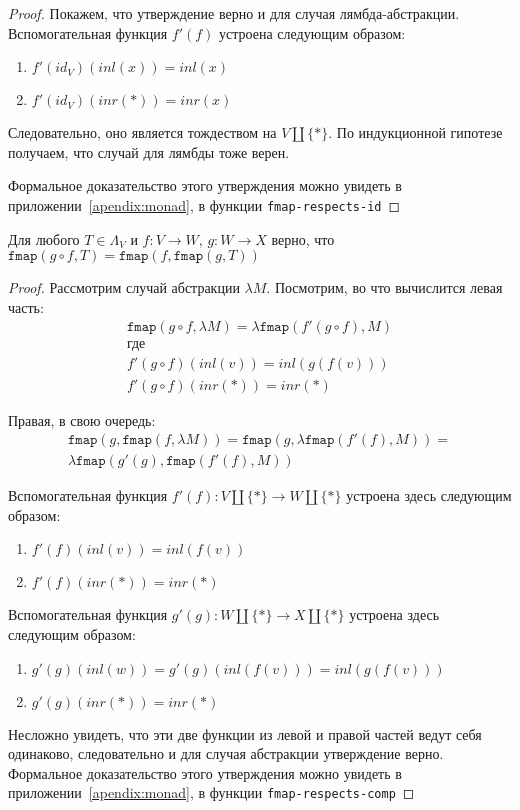 \begin{proof}
  Покажем, что утверждение верно и для случая лямбда-абстракции. Вспомогательная функция $f'(f)$ устроена следующим образом:
  \begin{enumerate}
    \item $f'(id_{V})(inl(x)) = inl(x)$
    \item $f'(id_{V})(inr(*)) = inr(x)$
  \end{enumerate}
  Следовательно, оно является тождеством на $V \coprod \{*\}$. По индукционной гипотезе получаем, что случай для лямбды тоже верен.

  Формальное доказательство этого утверждения можно увидеть в приложении~\ref{apendix:monad}, в функции \texttt{fmap-respects-id}
\end{proof}

\begin{prop}
  \label{monad:fmap-resp-comp}
  Для любого $T \in \Lambda_{V}$ и $f : V \to W$, $g : W \to X$ верно, что $\texttt{fmap}(g \circ f, T) = \texttt{fmap}(f, \texttt{fmap}(g, T))$
\end{prop}

\begin{proof}
  Рассмотрим случай абстракции $\lambda M$. Посмотрим, во что вычислится левая часть:
  \begin{gather*}
    \texttt{fmap}(g \circ f, \lambda M) = \lambda \texttt{fmap}(f'(g \circ f), M) \\
    \text{где} \\
    f'(g \circ f)(inl(v)) = inl(g(f(v))) \\
    f'(g \circ f)(inr(*)) = inr(*)
  \end{gather*}

  Правая, в свою очередь:
  \begin{gather*}
    \texttt{fmap}(g, \texttt{fmap}(f, \lambda M)) = \texttt{fmap}(g, \lambda \texttt{fmap}(f'(f), M)) = \\
    \lambda \texttt{fmap}(g'(g), \texttt{fmap}(f'(f), M))
  \end{gather*}

  Вспомогательная функция $f'(f) : V \coprod \{*\} \to W \coprod \{*\}$ устроена здесь следующим образом:
  \begin{enumerate}
    \item $f'(f)(inl(v)) = inl(f(v))$
    \item $f'(f)(inr(*)) = inr(*)$
  \end{enumerate}

  Вспомогательная функция $g'(g) : W \coprod \{*\} \to X \coprod \{*\}$ устроена здесь следующим образом:
  \begin{enumerate}
    \item $g'(g)(inl(w)) = g'(g)(inl(f(v))) = inl(g(f(v)))$
    \item $g'(g)(inr(*)) = inr(*)$
  \end{enumerate}

  Несложно увидеть, что эти две функции из левой и правой частей ведут себя одинаково, следовательно и для случая абстракции утверждение верно.
  Формальное доказательство этого утверждения можно увидеть в приложении~\ref{apendix:monad}, в функции \texttt{fmap-respects-сomp}
\end{proof}

